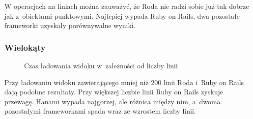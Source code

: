 \documentclass[printmode]{mgr}
\begin{document}
W operacjach na liniach można zauważyć, że Roda nie radzi sobie już tak dobrze jak z~obiektami punktowymi. Najlepiej wypada Ruby on Rails, dwa pozostałe frameworki uzyskały porównywalne wyniki.

\subsubsection{Wielokąty}

\begin{figure}[H]
  \centering
  \caption{Czas ładowania widoku w~zależności od liczby linii}
  \label{fig:read_lines}
\end{figure}

Przy ładowaniu widoku zawierającego mniej niż 200 linii Roda i~Ruby on Rails dają podobne rezultaty. Przy większej liczbie linii Ruby on Rails zyskuje przewagę. Hanami wypada najgorzej, ale różnica między nim, a~dwoma pozostałymi frameworkami spada wraz ze wzrostem liczby linii.
\end{document}
